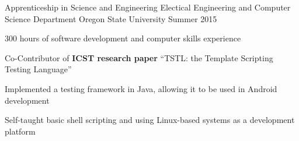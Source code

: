 \begin{cventries}
  \cventry
    {Apprenticeship in Science and Engineering} %
    {Electical Engineering and Computer Science Department} %
    {Oregon State University} %
    {Summer 2015} %
    {
      \begin{cvitems} %
        \item {300 hours of software development and computer skills experience}
        \item {Co-Contributor of \textbf{ICST research paper} “TSTL: the Template Scripting Testing Language”}
        \item {Implemented a testing framework in Java, allowing it to be used in Android development}
        \item {Self-taught basic shell scripting and using Linux-based systems as a development platform}
      \end{cvitems}
    }
\end{cventries}
